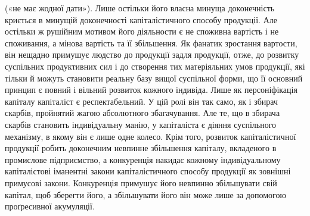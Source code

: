 \parcont{}  %
(«не має жодної дати»). Лише остільки його власна минуща
доконечність криється в минущій доконечності капіталістичного
способу продукції. Але остільки ж рушійним мотивом його
діяльности є не споживна вартість і не споживання, а мінова
вартість та її збільшення. Як фанатик зростання вартости, він
нещадно примушує людство до продукції задля продукції, отже,
до розвитку суспільних продуктивних сил і до створення тих
матеріяльних умов продукції, які тільки й можуть становити
реальну базу вищої суспільної форми, що її основний принцип
є повний і вільний розвиток кожного індивіда. Лише як персоніфікація
капіталу капіталіст є респектабельний. У цій ролі
він так само, як і збирач скарбів, пройнятий жагою абсолютного
збагачування. Але те, що в збирача скарбів становить індивідуальну
манію, у капіталіста є діяння суспільного механізму,
в якому він є лише одне колесо. Крім того, розвиток капіталістичної
продукції робить доконечним невпинне збільшення капіталу,
вкладеного в промислове підприємство, а конкуренція накидає
кожному індивідуальному капіталістові іманентні закони
капіталістичного способу продукції як зовнішні примусові закони.
Конкуренція примушує його невпинно збільшувати свій
капітал, щоб зберегти його, а збільшувати його він може лише
за допомогою проґресивної акумуляції.

